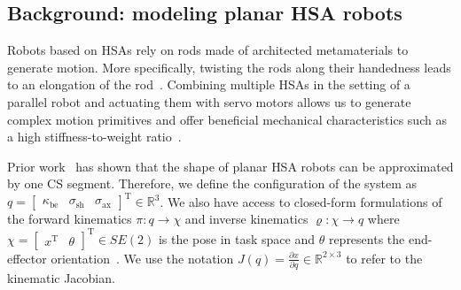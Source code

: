 \documentclass[letterpaper, 10pt, conference]{ieeeconf}      %
\begin{document}
\subsection{Background: modeling planar HSA robots}
Robots based on \glspl{HSA} rely on rods made of architected metamaterials to generate motion.  %
More specifically, twisting the rods along their handedness leads to an elongation of the rod~\cite{good2022expanding}. Combining multiple \glspl{HSA} in the setting of a parallel robot and actuating them with servo motors allows us to generate complex motion primitives and offer beneficial mechanical characteristics such as a high stiffness-to-weight ratio~\cite{stolzle2023modelling, good2022expanding}.

Prior work~\cite{stolzle2023experimental} has shown that the shape of planar \gls{HSA} robots can be approximated by one \gls{CS} segment. Therefore, we define the configuration of the system as $q = \begin{bmatrix}
    \kappa_\mathrm{be} & \sigma_\mathrm{sh} & \sigma_\mathrm{ax}
\end{bmatrix}^\mathrm{T} \in \mathbb{R}^3$.
We also have access to closed-form formulations of the forward kinematics $\pi: q \rightarrow \chi$ and inverse kinematics $\varrho: \chi \rightarrow q$ where $\chi = \begin{bmatrix}
    x^\mathrm{T} & \theta
\end{bmatrix}^\mathrm{T} \in SE(2)$ is the pose in task space and $\theta$ represents the end-effector orientation~\cite{stolzle2023experimental}.
We use the notation $J(q) = \frac{\partial x}{\partial q} \in \mathbb{R}^{2\times3}$ to refer to the kinematic Jacobian.
\end{document}
